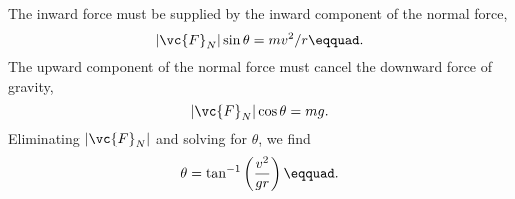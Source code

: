 The inward force must be supplied by the inward component
of the normal force,
\begin{equation*}
        |\vc{F}_N| \sin  \theta   =  mv ^2/ r\eqquad.
\end{equation*}
The upward component of the normal force must cancel the
downward force of gravity,
\begin{equation*}
        |\vc{F}_N| \cos  \theta   =  mg  .
\end{equation*}
Eliminating $|\vc{F}_N|$ and solving for $\theta $, we find
\begin{equation*}
     \theta = \tan^{-1}\left(\frac{v^2}{gr}\right)\eqquad.
\end{equation*}



